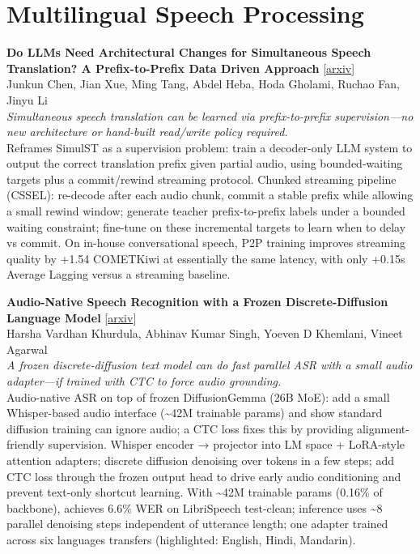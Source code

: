\documentclass[12pt,letterpaper]{article}
\begin{document}
\medskip


\section*{Multilingual Speech Processing}

{\small\textbf{Do LLMs Need Architectural Changes for Simultaneous Speech Translation? A Prefix-to-Prefix Data Driven Approach}} {\scriptsize[\href{https://arxiv.org/abs/2607.13158}{arxiv}]}\\
{\scriptsize Junkun Chen, Jian Xue, Ming Tang, Abdel Heba, Hoda Gholami, Ruchao Fan, Jinyu Li}\\

{\small\textit{Simultaneous speech translation can be learned via prefix-to-prefix supervision---no new architecture or hand-built read/write policy required.}}\\[1pt]
{\footnotesize Reframes SimulST as a supervision problem: train a decoder-only LLM system to output the correct translation prefix given partial audio, using bounded-waiting targets plus a commit/rewind streaming protocol. Chunked streaming pipeline (CSSEL): re-decode after each audio chunk, commit a stable prefix while allowing a small rewind window; generate teacher prefix-to-prefix labels under a bounded waiting constraint; fine-tune on these incremental targets to learn when to delay vs commit. On in-house conversational speech, P2P training improves streaming quality by +1.54 COMETKiwi at essentially the same latency, with only +0.15s Average Lagging versus a streaming baseline.}

\medskip

{\small\textbf{Audio-Native Speech Recognition with a Frozen Discrete-Diffusion Language Model}} {\scriptsize[\href{https://arxiv.org/abs/2607.13013}{arxiv}]}\\
{\scriptsize Harsha Vardhan Khurdula, Abhinav Kumar Singh, Yoeven D Khemlani, Vineet Agarwal}\\

{\small\textit{A frozen discrete-diffusion text model can do fast parallel ASR with a small audio adapter---if trained with CTC to force audio grounding.}}\\[1pt]
{\footnotesize Audio-native ASR on top of frozen DiffusionGemma (26B MoE): add a small Whisper-based audio interface (\textasciitilde{}42M trainable params) and show standard diffusion training can ignore audio; a CTC loss fixes this by providing alignment-friendly supervision. Whisper encoder → projector into LM space + LoRA-style attention adapters; discrete diffusion denoising over tokens in a few steps; add CTC loss through the frozen output head to drive early audio conditioning and prevent text-only shortcut learning. With \textasciitilde{}42M trainable params (0.16\% of backbone), achieves 6.6\% WER on LibriSpeech test-clean; inference uses \textasciitilde{}8 parallel denoising steps independent of utterance length; one adapter trained across six languages transfers (highlighted: English, Hindi, Mandarin).}
\end{document}
